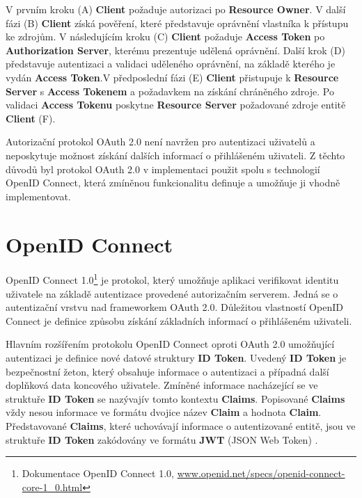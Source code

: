 \documentclass[
  printed, %
  twoside, %
  table,   %
  nolof,     %
  nolot,     %
]{fithesis3}
\begin{document}
V prvním kroku (A) \textbf{Client} požaduje autorizaci po \textbf{Resource Owner}. V další fázi (B) \textbf{Client} získá pověření, které představuje oprávnění vlastníka k přístupu ke zdrojům. V následujícím kroku (C) \textbf{Client} požaduje \textbf{Access Token} po \textbf{Authorization Server}, kterému prezentuje udělená oprávnění. Další krok (D) představuje autentizaci a validaci uděleného oprávnění, na základě kterého je vydán \textbf{Access Token}.\break V předposlední fázi (E) \textbf{Client} přistupuje k \textbf{Resource Server} s \textbf{Access Tokenem} a požadavkem na získání chráněného zdroje. Po validaci \textbf{Access Tokenu} poskytne \textbf{Resource Server} požadované zdroje entitě \textbf{Client} (F). \par 

Autorizační protokol OAuth 2.0 není navržen pro autentizaci uživatelů a neposkytuje možnost získání dalších informací o přihlášeném uživateli. Z těchto důvodů byl protokol OAuth 2.0 v implementaci použit spolu s technologií OpenID Connect, která zmíněnou funkcionalitu definuje a umožňuje ji vhodně implementovat. 

\section{OpenID Connect}
\label{sec:oidc}
OpenID Connect 1.0\footnote{Dokumentace OpenID Connect 1.0, \url{www.openid.net/specs/openid-connect-core-1_0.html}} je protokol, který umožňuje aplikaci verifikovat identitu uživatele na základě autentizace provedené autorizačním serverem. Jedná se o autentizační vrstvu nad frameworkem OAuth 2.0. Důležitou vlastností OpenID Connect je definice způsobu získání základních informací o přihlášeném uživateli. \par

Hlavním rozšířením protokolu OpenID Connect oproti OAuth 2.0 umožňující autentizaci je definice nové datové struktury \textbf{ID Token}. Uvedený \textbf{ID Token} je bezpečnostní žeton, který obsahuje informace o autentizaci a případná další doplňková data koncového uživatele. Zmíněné informace nacházející se ve struktuře \textbf{ID Token} se nazývají\break v tomto kontextu \textbf{Claims}. Popisované \textbf{Claims} vždy nesou informace ve formátu dvojice název \textbf{Claim} a hodnota \textbf{Claim}. Představované \textbf{Claims}, které uchovávají informace o autentizované entitě, jsou ve struktuře \textbf{ID Token} zakódovány ve formátu \textbf{JWT} (JSON Web Token) \cite{rfc7519}.    
\end{document}
